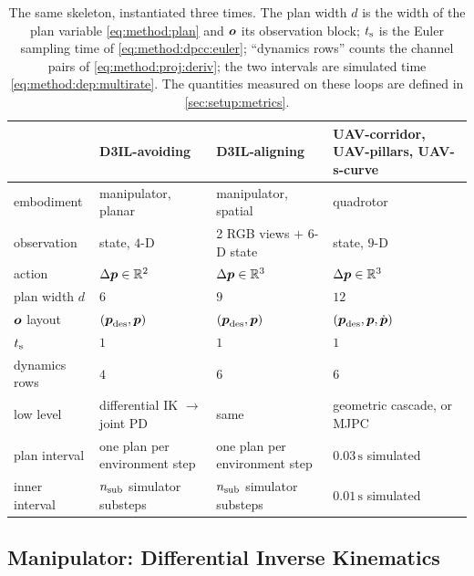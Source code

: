 \begin{table}[htpb]
  \caption[Embodiment instantiation]{The same skeleton, instantiated three times. The plan width $d$
  is the width of the plan variable \eqref{eq:method:plan} and $\vect{o}$ its observation block;
  $t\sidx{s}$ is the Euler sampling time of \eqref{eq:method:dpcc:euler}; ``dynamics rows'' counts the
  channel pairs of \eqref{eq:method:proj:deriv}; the two intervals are simulated time
  \eqref{eq:method:dep:multirate}. The quantities measured on these loops are defined in
  \autoref{sec:setup:metrics}.}
  \label{tab:embodiments}
  \centering\small
  \begin{tabularx}{\linewidth}{lLLL}
    \toprule
     & D3IL-avoiding & D3IL-aligning & UAV-corridor, UAV-pillars, UAV-s-curve \\
    \midrule
    embodiment      & manipulator, planar   & manipulator, spatial      & quadrotor \\
    observation     & state, $4$-D          & 2 RGB views $+$ $6$-D state & state, $9$-D \\
    action          & $\Delta\boldsymbol{p}\in\mathbb{R}^{2}$ & $\Delta\boldsymbol{p}\in\mathbb{R}^{3}$ & $\Delta\boldsymbol{p}\in\mathbb{R}^{3}$ \\
    plan width $d$  & $6$                   & $9$                       & $12$ \\
    $\vect{o}$ layout & $(\boldsymbol{p}_{\textrm{des}},\boldsymbol{p})$ & $(\boldsymbol{p}_{\textrm{des}},\boldsymbol{p})$ & $(\boldsymbol{p}_{\textrm{des}},\boldsymbol{p},\dot{\boldsymbol{p}})$ \\
    $t\sidx{s}$     & $1$                   & $1$                       & $1$ \\
    dynamics rows   & $4$                   & $6$                       & $6$ \\
    low level       & differential \ac{IK} $\rightarrow$ joint PD & same & geometric cascade, or \ac{MJPC} \\
    plan interval   & one plan per environment step & one plan per environment step & $0.03\,\textrm{s}$ simulated \\
    inner interval  & $n_{\textrm{sub}}$ simulator substeps & $n_{\textrm{sub}}$ simulator substeps & $0.01\,\textrm{s}$ simulated \\
    \bottomrule
  \end{tabularx}
\end{table}

\subsection{Manipulator: Differential Inverse Kinematics}\label{sec:method:ik}

